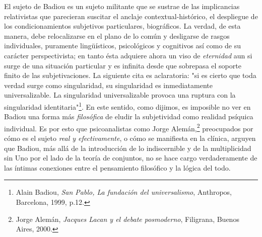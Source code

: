 El sujeto de Badiou es un sujeto militante que se sustrae de las
implicancias relativistas que parecieran suscitar el anclaje
contextual-histórico, el despliegue de los condicionamientos subjetivos
particulares, biográficos. La verdad, de esta manera, debe relocalizarse
en el plano de lo común y desligarse de rasgos individuales, puramente
lingüísticos, psicológicos y cognitivos así como de su carácter
perspectivista; en tanto ésta adquiere ahora un viso de \emph{eternidad}
aun si surge de una situación particular y es infinita desde que
sobrepasa el soporte finito de las subjetivaciones. La siguiente cita es
aclaratoria: "si es cierto que toda verdad surge como singularidad, su
singularidad es inmediatamente universalizable. La singularidad
universalizable provoca una ruptura con la singularidad
identitaria"\footnote{Alain Badiou, \emph{San Pablo, La fundación del
  universalismo}, Anthropos, Barcelona, 1999, p.12.}. En este sentido,
como dijimos, es imposible no ver en Badiou una forma más
\emph{filosófica} de eludir la subjetividad como realidad psíquica
individual. Es por esto que psicoanalistas como Jorge Alemán,\footnote{Jorge
  Alemán, \emph{Jacques Lacan y el debate posmoderno}, Filigrana, Buenos
  Aires, 2000.} preocupados por cómo es el sujeto \emph{real y
efectivamente}, o cómo se manifiesta en la clínica, arguyen que Badiou,
más allá de la introducción de lo indiscernible y de la multiplicidad
sin Uno por el lado de la teoría de conjuntos, no se hace cargo
verdaderamente de las íntimas conexiones entre el pensamiento filosófico
y la lógica del todo.

